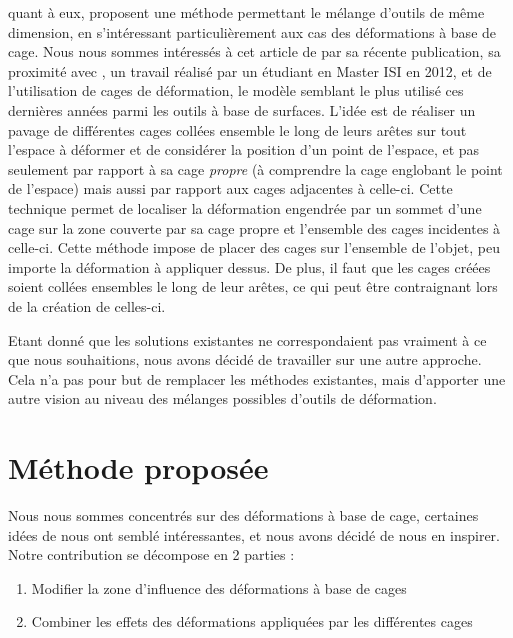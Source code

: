 \cite{GPCP13} quant à eux, proposent une méthode permettant le mélange
d'outils de même dimension, en s'intéressant particulièrement aux cas des
déformations à base de cage. Nous nous sommes intéressés à cet article de par
sa récente publication, sa proximité avec \cite{Hur12}, un travail réalisé par
un étudiant en Master ISI en 2012, et de l'utilisation de cages de
déformation, le modèle semblant le plus utilisé ces dernières années parmi les
outils à base de surfaces. L'idée est de réaliser un pavage de différentes
cages collées ensemble le long de leurs arêtes sur tout l'espace à déformer et
de considérer la position d'un point de l'espace, et pas seulement par rapport
à sa cage \textit{propre} (à comprendre la cage englobant le point de
l'espace) mais aussi par rapport aux cages adjacentes à celle-ci. Cette
technique permet de localiser la déformation engendrée par un sommet d'une
cage sur la zone couverte par sa cage propre et l'ensemble des cages
incidentes à celle-ci. Cette méthode impose de placer des cages sur l'ensemble
de l'objet, peu importe la déformation à appliquer dessus. De plus, il faut
que les cages créées soient collées ensembles le long de leur arêtes, ce qui
peut être contraignant lors de la création de celles-ci.

Etant donné que les solutions existantes ne correspondaient pas vraiment à ce
que nous souhaitions, nous avons décidé de travailler sur une autre approche.
Cela n'a pas pour but de remplacer les méthodes existantes, mais d'apporter une
autre vision au niveau des mélanges possibles d'outils de déformation.

\section{Méthode proposée}

Nous nous sommes concentrés sur des déformations à base de cage, certaines
idées de \cite{GPCP13} nous ont semblé intéressantes, et nous avons décidé de
nous en inspirer. Notre contribution se décompose en 2 parties :

\begin{enumerate}

\item Modifier la zone d'influence des déformations à base de cages

\item Combiner les effets des déformations appliquées par les différentes cages

\end{enumerate}

